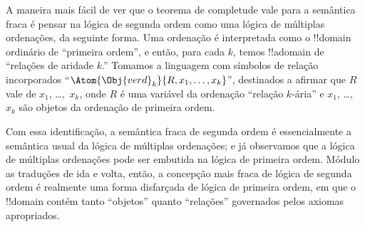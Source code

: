 \documentclass[../../../include/open-logic-section]{subfiles}
\begin{document}
A maneira mais fácil de ver que o teorema de completude vale para a
semântica fraca é pensar na lógica de segunda ordem como uma lógica de múltiplas ordenações,
da seguinte forma. Uma ordenação é interpretada como o !!{domain} ordinário
de ``primeira ordem'', e então, para cada $k$, temos !!a{domain}
de ``relações de aridade $k$.'' Tomamos a linguagem com símbolos de relação
incorporados ``$\Atom{\Obj{verd}_k}{R,x_1,\dots,x_k}$'', destinados a
afirmar que $R$ vale de $x_1$, \dots,~$x_k$, onde $R$ é uma
variável da ordenação ``relação $k$-ária'' e $x_1$, \dots,~$x_k$ são
objetos da ordenação de primeira ordem.

Com essa identificação, a semântica fraca de segunda ordem é essencialmente
a semântica usual da lógica de múltiplas ordenações; e já
observamos que a lógica de múltiplas ordenações pode ser embutida na lógica de primeira ordem.
Módulo as traduções de ida e volta, então, a concepção mais fraca de
lógica de segunda ordem é realmente uma forma disfarçada de lógica de primeira ordem,
em que o !!{domain} contém tanto ``objetos'' quanto ``relações''
governados pelos axiomas apropriados.
\end{document}
